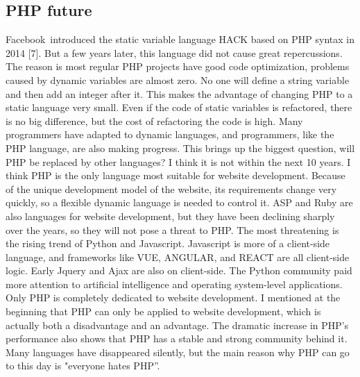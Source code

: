 \documentclass[12pt]{report}
\renewcommand{\_}{\kern-1.5pt\textunderscore\kern-1.5pt}
\begin{document}
\begin{multicols}{2}
\section{PHP future}
\setlength{\parskip}{6.0pt}
\begin{justify}
{\fontsize{10pt}{12.0pt}\selectfont Facebook\ introduced the static variable language HACK based on PHP syntax in 2014 [7]. But a few years later, this language did not cause great repercussions. The reason is most regular PHP projects have good code optimization, problems caused by dynamic variables are almost zero. No one will define a string variable and then add an integer after it. This makes the advantage of changing PHP to a static language very small. Even if the code of static variables is refactored, there is no big difference, but the cost of refactoring the code is high. Many programmers have adapted to dynamic languages, and programmers, like the PHP language, are also making progress. This brings up the biggest question, will PHP be replaced by other languages? I think it is not within the next 10 years. I think PHP is the only language most suitable for website development. Because of the unique development model of the website, its requirements change very quickly, so a flexible dynamic language is needed to control it. ASP and Ruby are also languages for website development, but they have been declining sharply over the years, so they will not pose a threat to PHP. The most threatening is the rising trend of Python and Javascript.  Javascript is more of a client-side language, and frameworks like VUE, ANGULAR, and REACT are all client-side logic. Early Jquery and Ajax are also on client-side. The Python community paid more attention to artificial intelligence and operating system-level applications. Only PHP is completely dedicated to website development. I mentioned at the beginning that PHP can only be applied to website development, which is actually both a disadvantage and an advantage. The dramatic increase in PHP's performance also shows that PHP has a stable and strong community behind it. Many languages have disappeared silently, but the main reason why PHP can go to this day is "everyone hates PHP''.\par}
\end{justify}


\begin{thebibliography}{99}


\end{thebibliography}
\end{multicols}
\end{document}

